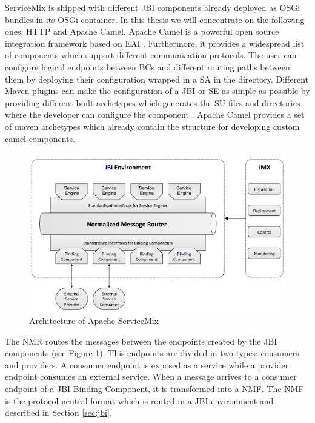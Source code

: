 ServiceMix is shipped with different \ac{JBI} components already deployed as \ac{OSGi} bundles in its \ac{OSGi} container. In this thesis we will concentrate on the following ones: HTTP and Apache Camel. Apache Camel is a powerful open source integration framework based on \ac{EAI} \cite{Camel2011}. Furthermore, it provides a widespread list of components which support different communication protocols.  The user can configure logical endpoints between \ac{BC}s and different routing paths between them by deploying their configuration wrapped in a \ac{SA} in the  directory. Different Maven plugins can make the configuration of a \ac{JBI} or \ac{SE} as simple as possible by providing different built archetypes which generates the \ac{SU} files and directories where the developer can configure the component \cite{MAVEN}. Apache Camel provides a set of maven archetypes which already contain the structure for developing custom camel components.

\begin{figure}[htb]
	\centering
		\includegraphics[clip, scale=0.4]{./gfx/servicemix.png}
	\caption[Architecture of Apache ServiceMix]{Architecture of Apache ServiceMix \cite{ASM} }
	\label{fig:servicemix}
\end{figure}

The \ac{NMR} routes the messages between the endpoints created by the \ac{JBI} components (see Figure \ref{fig:servicemix}). This endpoints are divided in two types: consumers and providers. A consumer endpoint is exposed as a service while a provider endpoint consumes an external service. When a message arrives to a consumer endpoint of a \ac{JBI} Binding Component, it is transformed into a \ac{NMF}. The \ac{NMF} is the protocol neutral format which is routed in a \ac{JBI} environment and described in Section \ref{sec:jbi}. 

